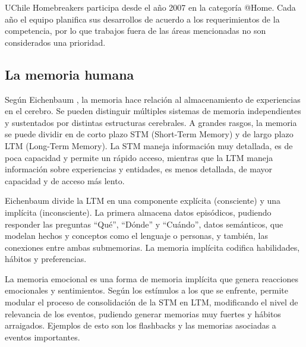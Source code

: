 UChile Homebreakers participa desde el año 2007 en la categoría @Home. Cada año el equipo planifica sus desarrollos de acuerdo a los requerimientos de la competencia, por lo que trabajos fuera de las áreas mencionadas no son considerados una prioridad.


\subsection{La memoria humana}

Según Eichenbaum \cite{Eichenbaum:2008}, la memoria hace relación al almacenamiento de experiencias en el cerebro. Se pueden distinguir múltiples sistemas de memoria independientes y sustentados por distintas estructuras cerebrales. A grandes rasgos, la memoria se puede dividir en de corto plazo STM (Short-Term Memory) y de largo plazo LTM (Long-Term Memory). La STM maneja información muy detallada, es de poca capacidad y permite un rápido acceso, mientras que la LTM maneja información sobre experiencias y entidades, es menos detallada, de mayor capacidad y de acceso más lento.

Eichenbaum divide la LTM en una componente explícita (consciente) y una implícita (inconsciente). La primera almacena datos episódicos, pudiendo responder las preguntas ``Qué'', ``Dónde'' y ``Cuándo'', datos semánticos, que modelan hechos y conceptos como el lenguaje o personas, y también, las conexiones entre ambas submemorias. La memoria implícita codifica habilidades, hábitos y preferencias.

La memoria emocional es una forma de memoria implícita que genera reacciones emocionales y sentimientos. Según los estímulos a los que se enfrente, permite modular el proceso de consolidación de la STM en LTM, modificando el nivel de relevancia de los eventos, pudiendo generar memorias muy fuertes y hábitos arraigados. Ejemplos de esto son los flashbacks y las memorias asociadas a eventos importantes.




